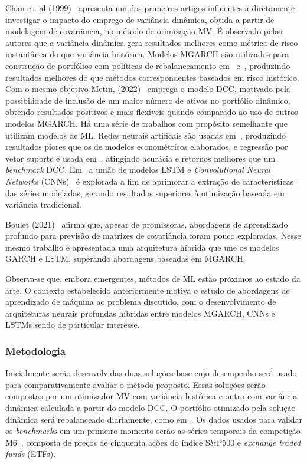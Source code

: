 \documentclass[a4paper, 12pt]{article}
\begin{document}
\begin{spacing}{.9}
Chan et. al (1999)~\cite{chan1999portfolio} apresenta um dos primeiros artigos
influentes a diretamente investigar o impacto do emprego de variância dinâmica,
obtida a partir de modelagem de covariância, no método de otimização MV. É
observado pelos autores que a variância dinâmica gera resultados melhores como
métrica de risco instantânea do que variância histórica. Modelos MGARCH são
utilizados para construção de portfólios com políticas de rebalanceamento
em~\cite{holten} e~\cite{weirum}, produzindo resultados melhores do que métodos
correspondentes baseados em risco histórico. Com o mesmo objetivo Metin,
(2022)~\cite{metin} emprega o modelo DCC, motivado pela possibilidade de
inclusão de um maior número de ativos no portfólio dinâmico, obtendo resultados
positivos e mais flexíveis quando comparado ao uso de outros modelos MGARCH. Há
uma série de trabalhos com propósito semelhante que utilizam modelos de ML.
Redes neurais artificais são usadas em~\cite{ann}, produzindo resultados piores
que os de modelos econométricos elaborados, e regressão por vetor suporte é
usada em~\cite{svr}, atingindo acurácia e retornos melhores que um
\emph{benchmark} DCC. Em~\cite{dl2} a união de modelos LSTM e
\emph{Convolutional Neural Networks} (CNNs)~\cite{cnn} é explorada a fim de
aprimorar a extração de características das séries modeladas, gerando
resultados superiores à otimização baseada em variância tradicional.

Boulet (2021)~\cite{dl_multi} afirma que, apesar de promissoras, abordagens de
aprendizado profundo para previsão de matrizes de covariância foram pouco
exploradas. Nesse mesmo trabalho é apresentada uma arquitetura híbrida que une
os modelos GARCH e LSTM, superando abordagens baseadas em MGARCH.

Observa-se que, embora emergentes, métodos de ML estão próximos ao estado da
arte. O contexto estabelecido anteriormente motiva o estudo de abordagens de
aprendizado de máquina ao problema discutido, com o desenvolvimento de
arquiteturas neurais profundas híbridas entre modelos MGARCH, CNNs e LSTMs
sendo de particular interesse.

\subsubsection*{Metodologia}

Inicialmente serão desenvolvidas duas soluções base cujo desempenho será usado
para comparativamente avaliar o método proposto. Essas soluções serão compostas
por um otimizador MV com variância histórica e outro com variância dinâmica
calculada a partir do modelo DCC. O portfólio otimizado pela solução dinâmica
será rebalanceado diariamente, como em~\cite{metin}. Os dados usados para
validar os \emph{benchmarks} em um primeiro momento serão as séries temporais
da competição M6~\cite{m6}, composta de preços de cinquenta ações do índice
S\&P500 e \emph{exchange traded funds} (ETFs).


\end{spacing}
\end{document}
